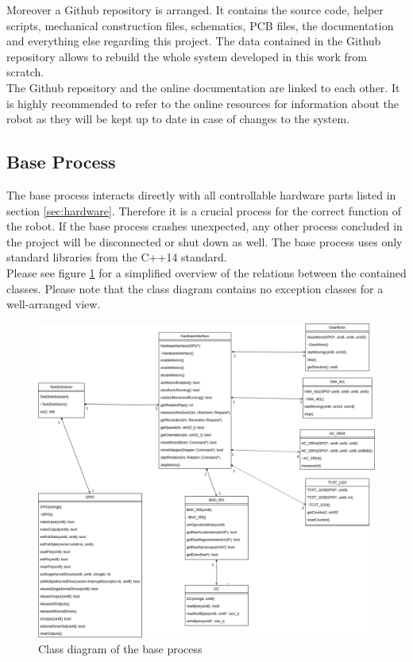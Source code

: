 Moreover a Github repository \cite{github} is arranged. It contains the source code, helper scripts, mechanical construction files, schematics, PCB files, the documentation and everything else regarding this project. The data contained in the Github repository allows to rebuild the whole system developed in this work from scratch.\\

The Github repository and the online documentation are linked to each other. It is highly recommended to refer to the online resources for information about the robot as they will be kept up to date in case of changes to the system.

\newpage

\subsection{Base Process}\label{subsec:base_process}

The base process interacts directly with all controllable hardware parts listed in section \ref{sec:hardware}. Therefore it is a crucial process for the correct function of the robot. If the base process crashes unexpected, any other process concluded in the project will be disconnected or shut down as well. The base process uses only standard libraries from the C++14 standard.\\

Please see figure \ref{fig:class_diagram_base} for a simplified overview of the relations between the contained classes. Please note that the class diagram contains no exception classes for a well-arranged view.\\

\begin{figure}[H]
\centering
\includegraphics[width=\textwidth]{sources/class_diagram_base.png}
\caption[Class diagram base process]{Class diagram of the base process}
\label{fig:class_diagram_base}
\end{figure}

